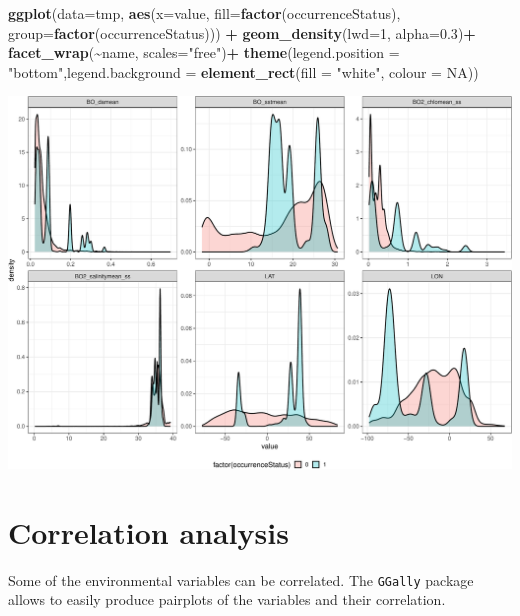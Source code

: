 \documentclass[
]{book}
\newenvironment{Shaded}{\begin{snugshade}}{\end{snugshade}}
\newcommand{\AttributeTok}[1]{\textcolor[rgb]{0.13,0.29,0.53}{#1}}
\newcommand{\ConstantTok}[1]{\textcolor[rgb]{0.56,0.35,0.01}{#1}}
\newcommand{\DecValTok}[1]{\textcolor[rgb]{0.00,0.00,0.81}{#1}}
\newcommand{\FloatTok}[1]{\textcolor[rgb]{0.00,0.00,0.81}{#1}}
\newcommand{\FunctionTok}[1]{\textcolor[rgb]{0.13,0.29,0.53}{\textbf{#1}}}
\newcommand{\NormalTok}[1]{#1}
\newcommand{\SpecialCharTok}[1]{\textcolor[rgb]{0.81,0.36,0.00}{\textbf{#1}}}
\newcommand{\StringTok}[1]{\textcolor[rgb]{0.31,0.60,0.02}{#1}}
\begin{document}
\begin{Shaded}
\begin{Highlighting}[]
\FunctionTok{ggplot}\NormalTok{(}\AttributeTok{data=}\NormalTok{tmp, }\FunctionTok{aes}\NormalTok{(}\AttributeTok{x=}\NormalTok{value, }\AttributeTok{fill=}\FunctionTok{factor}\NormalTok{(occurrenceStatus), }\AttributeTok{group=}\FunctionTok{factor}\NormalTok{(occurrenceStatus))) }\SpecialCharTok{+} 
  \FunctionTok{geom\_density}\NormalTok{(}\AttributeTok{lwd=}\DecValTok{1}\NormalTok{, }\AttributeTok{alpha=}\FloatTok{0.3}\NormalTok{)}\SpecialCharTok{+}
  \FunctionTok{facet\_wrap}\NormalTok{(}\SpecialCharTok{\textasciitilde{}}\NormalTok{name, }\AttributeTok{scales=}\StringTok{"free"}\NormalTok{)}\SpecialCharTok{+}
  \FunctionTok{theme}\NormalTok{(}\AttributeTok{legend.position =} \StringTok{"bottom"}\NormalTok{,}\AttributeTok{legend.background =} \FunctionTok{element\_rect}\NormalTok{(}\AttributeTok{fill =} \StringTok{"white"}\NormalTok{, }\AttributeTok{colour =} \ConstantTok{NA}\NormalTok{))}
\end{Highlighting}
\end{Shaded}

\includegraphics{_main_files/figure-latex/unnamed-chunk-49-2.pdf}

\section{Correlation analysis}\label{correlation-analysis}

Some of the environmental variables can be correlated. The \texttt{GGally} package allows to easily produce pairplots of the variables and their correlation.
\end{document}
